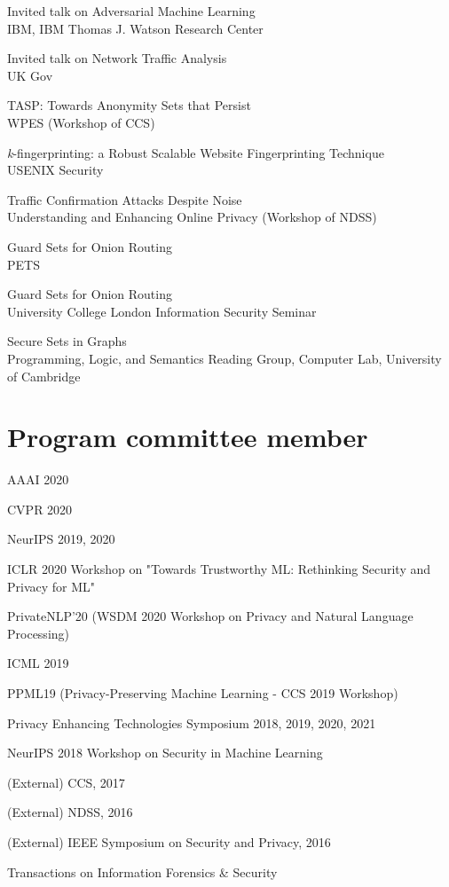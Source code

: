 \documentclass[margin,line]{res}
\begin{document}
\begin{resume}
Invited talk on Adversarial Machine Learning\\
IBM, IBM Thomas J. Watson Research Center

Invited talk on Network Traffic Analysis\\
UK Gov

TASP: Towards Anonymity Sets that Persist\\
WPES (Workshop of CCS) 

\emph{k}-fingerprinting: a Robust Scalable Website Fingerprinting
Technique\\
USENIX Security 

Traffic Confirmation Attacks Despite Noise\\
Understanding and Enhancing Online Privacy (Workshop of NDSS)

Guard Sets for Onion Routing\\
PETS 

Guard Sets for Onion Routing\\
University College London Information Security Seminar

Secure Sets in Graphs\\
Programming, Logic, and Semantics Reading Group, Computer Lab, University of Cambridge


\section{\sc Program committee member}

AAAI 2020

CVPR 2020

NeurIPS 2019, 2020

ICLR 2020 Workshop on "Towards Trustworthy ML: Rethinking Security and Privacy for ML"

PrivateNLP'20 (WSDM 2020 Workshop on Privacy and Natural Language Processing)

ICML 2019

 PPML19 (Privacy-Preserving Machine Learning - CCS 2019 Workshop)

Privacy Enhancing Technologies Symposium 2018, 2019, 2020, 2021

NeurIPS 2018 Workshop on Security in Machine Learning

(External) CCS, 2017

(External) NDSS, 2016

(External) IEEE Symposium on Security and Privacy, 2016

Transactions on Information Forensics \& Security


\end{resume}
\end{document}
